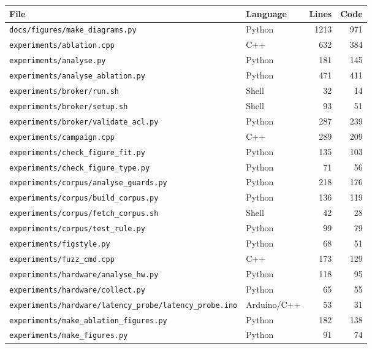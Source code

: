 \begin{longtable}{p{} l r r}
\toprule
\textbf{File} & \textbf{Language} & \textbf{Lines} & \textbf{Code} \\
\midrule
\endhead
\texttt{\footnotesize docs/figures/make\_diagrams.py} & Python & 1213 & 971 \\
\texttt{\footnotesize experiments/ablation.cpp} & C++ & 632 & 384 \\
\texttt{\footnotesize experiments/analyse.py} & Python & 181 & 145 \\
\texttt{\footnotesize experiments/analyse\_ablation.py} & Python & 471 & 411 \\
\texttt{\footnotesize experiments/broker/run.sh} & Shell & 32 & 14 \\
\texttt{\footnotesize experiments/broker/setup.sh} & Shell & 93 & 51 \\
\texttt{\footnotesize experiments/broker/validate\_acl.py} & Python & 287 & 239 \\
\texttt{\footnotesize experiments/campaign.cpp} & C++ & 289 & 209 \\
\texttt{\footnotesize experiments/check\_figure\_fit.py} & Python & 135 & 103 \\
\texttt{\footnotesize experiments/check\_figure\_type.py} & Python & 71 & 56 \\
\texttt{\footnotesize experiments/corpus/analyse\_guards.py} & Python & 218 & 176 \\
\texttt{\footnotesize experiments/corpus/build\_corpus.py} & Python & 136 & 119 \\
\texttt{\footnotesize experiments/corpus/fetch\_corpus.sh} & Shell & 42 & 28 \\
\texttt{\footnotesize experiments/corpus/test\_rule.py} & Python & 99 & 79 \\
\texttt{\footnotesize experiments/figstyle.py} & Python & 68 & 51 \\
\texttt{\footnotesize experiments/fuzz\_cmd.cpp} & C++ & 173 & 129 \\
\texttt{\footnotesize experiments/hardware/analyse\_hw.py} & Python & 118 & 95 \\
\texttt{\footnotesize experiments/hardware/collect.py} & Python & 65 & 55 \\
\texttt{\footnotesize experiments/hardware/latency\_probe/latency\_probe.ino} & Arduino/C++ & 53 & 31 \\
\texttt{\footnotesize experiments/make\_ablation\_figures.py} & Python & 182 & 138 \\
\texttt{\footnotesize experiments/make\_figures.py} & Python & 91 & 74 \\

\end{longtable}
